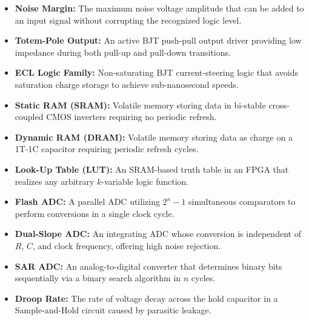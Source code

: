 \documentclass[12pt,a4paper]{article}
\begin{document}
\begin{tcolorbox}[defbox, title={\textbf{One-Line Definitions}}]
\begin{itemize}[leftmargin=*, itemsep=2pt, topsep=0pt]
  \item \textbf{Noise Margin:} The maximum noise voltage amplitude that can be added to an input signal without corrupting the recognized logic level.
  \item \textbf{Totem-Pole Output:} An active BJT push-pull output driver providing low impedance during both pull-up and pull-down transitions.
  \item \textbf{ECL Logic Family:} Non-saturating BJT current-steering logic that avoids saturation charge storage to achieve sub-nanosecond speeds.
  \item \textbf{Static RAM (SRAM):} Volatile memory storing data in bi-stable cross-coupled CMOS inverters requiring no periodic refresh.
  \item \textbf{Dynamic RAM (DRAM):} Volatile memory storing data as charge on a 1T-1C capacitor requiring periodic refresh cycles.
  \item \textbf{Look-Up Table (LUT):} An SRAM-based truth table in an FPGA that realizes any arbitrary $k$-variable logic function.
  \item \textbf{Flash ADC:} A parallel ADC utilizing $2^n - 1$ simultaneous comparators to perform conversions in a single clock cycle.
  \item \textbf{Dual-Slope ADC:} An integrating ADC whose conversion is independent of $R$, $C$, and clock frequency, offering high noise rejection.
  \item \textbf{SAR ADC:} An analog-to-digital converter that determines binary bits sequentially via a binary search algorithm in $n$ cycles.
  \item \textbf{Droop Rate:} The rate of voltage decay across the hold capacitor in a Sample-and-Hold circuit caused by parasitic leakage.
\end{itemize}
\end{tcolorbox}
\end{document}
